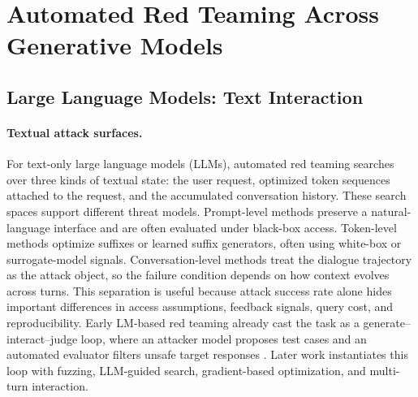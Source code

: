 \section{Automated Red Teaming Across Generative Models}
\label{sec:targets}

\subsection{Large Language Models: Text Interaction}

\paragraph{Textual attack surfaces.}
For text-only large language models (LLMs), automated red teaming searches over three kinds of textual state: the user request, optimized token sequences attached to the request, and the accumulated conversation history. These search spaces support different threat models. Prompt-level methods preserve a natural-language interface and are often evaluated under black-box access. Token-level methods optimize suffixes or learned suffix generators, often using white-box or surrogate-model signals. Conversation-level methods treat the dialogue trajectory as the attack object, so the failure condition depends on how context evolves across turns. This separation is useful because attack success rate alone hides important differences in access assumptions, feedback signals, query cost, and reproducibility. Early LM-based red teaming already cast the task as a generate--interact--judge loop, where an attacker model proposes test cases and an automated evaluator filters unsafe target responses \cite{perez-etal-2022-red}. Later work instantiates this loop with fuzzing, LLM-guided search, gradient-based optimization, and multi-turn interaction.

